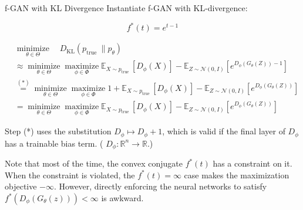 \begin{frame}[allowframebreaks]

\begin{myconceptblock}{21.23}{f-GAN with KL Divergence}
    Instantiate f-GAN with KL-divergence: 

    $$
    f^{*}(t)=e^{t-1}
    $$

    $$
    \begin{aligned}
    & \underset{\theta \in \Theta}{\operatorname{minimize}} \quad D_{\mathrm{KL}}\left(p_{\text {true }} \| p_{\theta}\right) \\
    & \approx \underset{\theta \in \Theta}{\operatorname{minimize}} \underset{\phi \in \Phi}{\operatorname{maximize}} \mathbb{E}_{X \sim p_{\text {true }}}\left[D_{\phi}(X)\right]-\mathbb{E}_{Z \sim \mathcal{N}(0, I)}\left[e^{D_{\phi}\left(G_{\theta}(Z)\right)-1}\right] \\
    & \stackrel{(*)}{=} \underset{\theta \in \Theta}{\operatorname{minimize}} \underset{\phi \in \Phi}{\operatorname{maximize}} 1+\mathbb{E}_{X \sim p_{\text {true }}}\left[D_{\phi}(X)\right]-\mathbb{E}_{Z \sim \mathcal{N}(0, I)}\left[e^{D_{\phi}\left(G_{\theta}(Z)\right)}\right] \\
    & =\underset{\theta \in \Theta}{\operatorname{minimize}} \underset{\phi \in \Phi}{\operatorname{maximize}} \mathbb{E}_{X \sim p_{\text {true }}}\left[D_{\phi}(X)\right]-\mathbb{E}_{Z \sim \mathcal{N}(0, I)}\left[e^{D_{\phi}\left(G_{\theta}(Z)\right)}\right]
    \end{aligned}
    $$

    Step (*) uses the substitution $D_{\phi} \mapsto D_{\phi}+1$, which is valid if the final layer of $D_{\phi}$ has a trainable bias term. ( $D_{\phi}: \mathbb{R}^{n} \rightarrow \mathbb{R}$.)
\end{myconceptblock}

\end{frame}


\begin{frame}[allowframebreaks]

Note that most of the time, the convex conjugate $f^{*}(t)$ has a constraint on it.
When the constraint is violated, the $f^{*}(t)=\infty$ case makes the maximization objective $-\infty$.
However, directly enforcing the neural networks to satisfy $f^{*}(D_{\phi}\left(G_{\theta}(z)\right))<\infty$ is awkward.

\end{frame}

